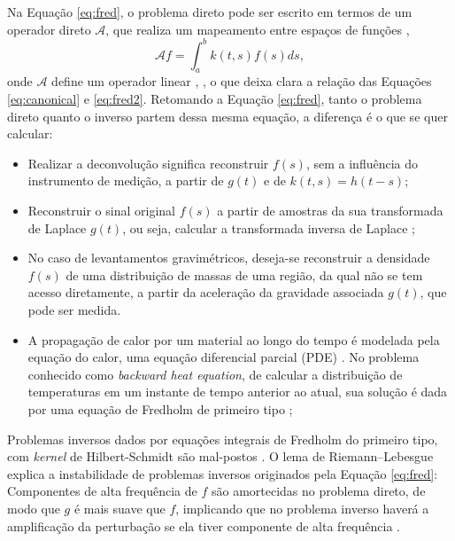 Na Equação \eqref{eq:fred}, o problema direto pode ser escrito em termos de um operador direto $\mathcal{A}$, que realiza um mapeamento entre espaços de funções \cite[pág. 8]{Montegranario2014},
\begin{equation}
\mathcal{A} f = \int_a^b k(t,s) f(s) ds, 
\label{eq:fred2}
\end{equation}
onde $\mathcal{A}$ define um operador linear \cite[pág. 7]{hansen2010discrete}, \cite[pág. 41]{Mueller2012}, o que deixa clara a relação das Equações \eqref{eq:canonical} e \eqref{eq:fred2}. Retomando a Equação \eqref{eq:fred}, tanto o problema direto quanto o inverso partem dessa mesma equação, a diferença é o que se quer calcular: 
\begin{itemize}

\item Realizar a deconvolução significa reconstruir $f(s)$, sem a influência do instrumento de medição, a partir de $g(t)$ e de $k(t,s) = h(t-s)$;
\item Reconstruir o sinal original $f(s)$ a partir de amostras da sua transformada de Laplace $g(t)$, ou seja, calcular a transformada inversa de Laplace \cite[pág. 133]{Mueller2012};
\item No caso de levantamentos gravimétricos, deseja-se reconstruir a densidade $f(s)$ de uma distribuição de massas de uma região, da qual não se tem acesso diretamente, a partir da aceleração da gravidade associada $g(t)$, que pode ser medida.


\item A propagação de calor por um material ao longo do tempo é modelada pela equação do calor, uma equação diferencial parcial (PDE) \cite[Subseção 2.2]{Mueller2012}. No problema conhecido como \textit{backward heat equation}, de calcular a distribuição de temperaturas em um instante de tempo anterior ao atual, sua solução é dada por uma equação de Fredholm de primeiro tipo \cite[págs. 36-7]{Mueller2012}; 

\end{itemize}


Problemas inversos dados por equações integrais de Fredholm do primeiro tipo, com \textit{kernel} de Hilbert-Schmidt são mal-postos \cite[págs. 40-1]{Mueller2012}. O lema de Riemann–Lebesgue explica a instabilidade de problemas inversos originados pela Equação \eqref{eq:fred}: Componentes de alta frequência de $f$ são amortecidas no problema direto, de modo que $g$ é mais suave que $f$, implicando que no problema inverso haverá a amplificação da perturbação se ela tiver componente de alta frequência \cite[pág. 8]{hansen2010discrete}.




